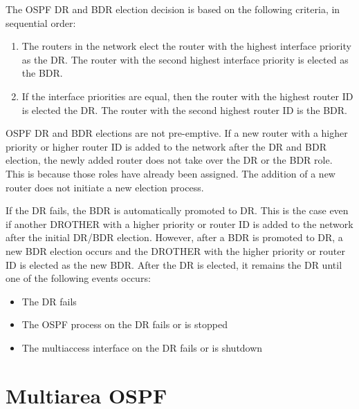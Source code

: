 The OSPF DR and BDR election decision is based on the following criteria, in sequential order:
\begin{enumerate}
	\item The routers in the network elect the router with the highest interface priority as the DR. The router with the second highest interface priority is elected as the BDR.
	\item If the interface priorities are equal, then the router with the highest router ID is elected the DR. The router with the second highest router ID is the BDR.
	\end{enumerate}
OSPF DR and BDR elections are not pre-emptive. If a new router with a higher priority or higher router ID is added to the network after the DR and BDR election, the newly added router does not take over the DR or the BDR role. This is because those roles have already been assigned. The addition of a new router does not initiate a new election process.\par 
If the DR fails, the BDR is automatically promoted to DR. This is the case even if another DROTHER with a higher priority or router ID is added to the network after the initial DR/BDR election. However, after a BDR is promoted to DR, a new BDR election occurs and the DROTHER with the higher priority or router ID is elected as the new BDR.
After the DR is elected, it remains the DR until one of the following events occurs:
\begin{itemize}
	\item The DR fails
	\item The OSPF process on the DR fails or is stopped
	\item The multiaccess interface on the DR fails or is shutdown
	\end{itemize}


\section{Multiarea OSPF}
